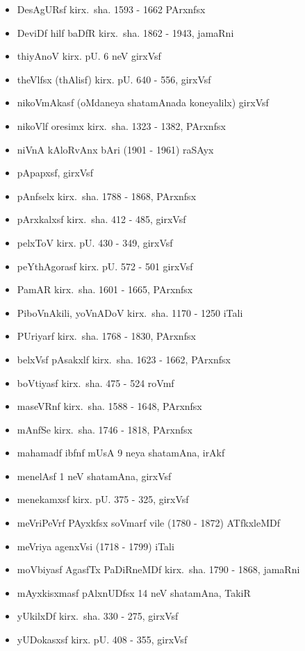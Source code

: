 {\begin{itemize}
\item DesAgURsf kirx.~sha. {\rm 1593 - 1662} PArxnfsx
\item DeviDf hilf baDfR kirx.~sha. {\rm 1862 - 1943}, jamaRni
\item thiyAnoV kirx. pU. {\rm 6} neV girxVsf
\item theVlfsx (thAlisf) kirx. pU. {\rm 640 - 556}, girxVsf
\item nikoVmAkasf (oMdaneya shatamAnada koneyalilx) girxVsf
\item nikoVlf oresimx kirx.~sha. {\rm 1323 - 1382}, PArxnfsx
\item niVnA kAloRvAnx bAri {\rm (1901 - 1961)} raSAyx
\item pApapxsf, girxVsf
\item pAnfselx kirx.~sha. {\rm 1788 - 1868}, PArxnfsx
\item pArxkalxsf kirx.~sha. {\rm 412 - 485}, girxVsf
\item pelxToV kirx. pU. {\rm 430 - 349}, girxVsf
\item peYthAgorasf kirx. pU. {\rm 572 - 501} girxVsf
\item PamAR kirx.~sha. {\rm 1601 - 1665}, PArxnfsx
\item PiboVnAkili, yoVnADoV kirx.~sha. {\rm 1170 - 1250} iTali
\item PUriyarf kirx.~sha. {\rm 1768 - 1830}, PArxnfsx
\item belxVsf pAsakxlf kirx.~sha. {\rm 1623 - 1662}, PArxnfsx
\item boVtiyasf kirx.~sha. {\rm 475 - 524} roVmf
\item maseVRnf kirx.~sha. {\rm 1588 - 1648}, PArxnfsx
\item mAnfSe kirx.~sha. {\rm 1746 - 1818}, PArxnfsx
\item mahamadf ibfnf mUsA {\rm 9} neya shatamAna, irAkf
\item menelAsf {\rm 1} neV shatamAna, girxVsf
\item menekamxsf kirx. pU. {\rm 375 - 325}, girxVsf 
\item meVriPeVrf PAyxkfsx soVmarf vile {\rm (1780 - 1872)} ATfkxleMDf
\item meVriya agenxVsi {\rm (1718 - 1799)} iTali
\item moVbiyasf AgasfTx PaDiRneMDf kirx.~sha. {\rm 1790 - 1868}, jamaRni
\item mAyxkisxmasf pAlxnUDfsx {\rm 14} neV shatamAna, TakiR
\item yUkilxDf kirx.~sha. {\rm 330 - 275}, girxVsf
\item yUDokasxsf kirx. pU. {\rm 408 - 355}, girxVsf

\end{itemize}}
